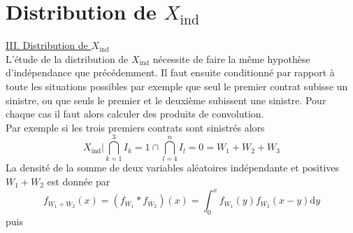 \documentclass[8pt,notheorems]{beamer}
\theoremstyle{definition}
\theoremstyle{example}
\theoremstyle{mystyle}
\theoremstyle{plain}
\begin{document}
\section{Distribution de $X_\text{ind}$}
\begin{frame}[allowframebreaks]
\underline{III. Distribution de $X_\text{ind}$}\\
L'étude de la distribution de $X_\text{ind}$ nécessite de faire la même hypothèse d'indépendance que précédemment. Il faut ensuite conditionné par rapport à toute les situations possibles par exemple que seul le premier contrat subisse un sinistre, ou que seuls le premier et le deuxième subissent une sinistre. Pour chaque cas il faut alors calculer des produits de convolution.\\

Par exemple si les trois premiers contrats sont sinistrés alors 
$$
X_\text{ind}\Big\rvert\bigcap_{k=1}^{3}{I_k=1}\cap\bigcap_{l=4}^{n}{I_l=0} = W_1+W_2+W_3 
$$
La densité de la somme de deux variables aléatoires indépendante et positives $W_1+W_2$ est donnée par 
$$
f_{W_1+W_2}(x) = (f_{W_1}\ast f_{W_2})(x)=\int_{0}^{x}f_{W_1}(y)f_{W_2}(x-y)\text{d}y
$$
puis 


\end{frame}
\end{document}
